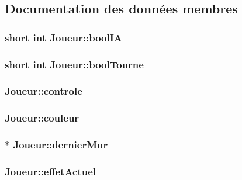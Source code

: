 \subsection{Documentation des données membres}
\hypertarget{structJoueur_a2294a826a87221de10ee4aa493598493}{
\subsubsection[{bool\-I\-A}]{\setlength{\rightskip}{0pt plus 5cm}short int Joueur\-::bool\-I\-A}}\label{structJoueur_a2294a826a87221de10ee4aa493598493}
\hypertarget{structJoueur_a439aff6381e9272c2fbb737dfa2362bc}{
\subsubsection[{bool\-Tourne}]{\setlength{\rightskip}{0pt plus 5cm}short int Joueur\-::bool\-Tourne}}\label{structJoueur_a439aff6381e9272c2fbb737dfa2362bc}
\hypertarget{structJoueur_a9e673b161d97d9530f7ff108d5ea8b52}{
\subsubsection[{controle}]{ Joueur\-::controle}}\label{structJoueur_a9e673b161d97d9530f7ff108d5ea8b52}
\hypertarget{structJoueur_a966bbda4413e0b0d7aaf109660926639}{
\subsubsection[{couleur}]{ Joueur\-::couleur}}\label{structJoueur_a966bbda4413e0b0d7aaf109660926639}
\hypertarget{structJoueur_a0af7df8d2ab1d60cad2cc220459d7aa3}{
\subsubsection[{dernier\-Mur}]{$\ast$ Joueur\-::dernier\-Mur}}\label{structJoueur_a0af7df8d2ab1d60cad2cc220459d7aa3}
\hypertarget{structJoueur_aba2ad8c2cbba6a62b7f30c76373f8b4e}{
\subsubsection[{effet\-Actuel}]{ Joueur\-::effet\-Actuel}}\label{structJoueur_aba2ad8c2cbba6a62b7f30c76373f8b4e}
